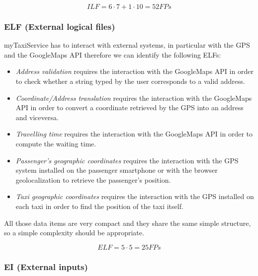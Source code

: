 \[
ILF=6\cdot7+1\cdot10=52FPs
\]



\subsubsection{ELF (External logical files)}

myTaxiService has to interact with external systems, in particular
with the GPS and the GoogleMaps API therefore we can identify the
following ELFs:
\begin{itemize}
\item \emph{Address validation }requires the interaction with the GoogleMaps
API in order to check whether a string typed by the user corresponds
to a valid address.
\item \emph{Coordinate/Address translation} requires the interaction with
the GoogleMaps API in order to convert a coordinate retrieved by the
GPS into an address and viceversa.
\item \emph{Travelling time }requires the interaction with the GoogleMaps
API in order to compute the waiting time.
\item \emph{Passenger's geographic coordinates} requires the interaction
with the GPS system installed on the passenger smartphone or with
the browser geolocalization to retrieve the passenger's position.
\item \emph{Taxi geographic coordinates} requires the interaction with the
GPS installed on each taxi in order to find the position of the taxi
itself.
\end{itemize}
All those data items are very compact and they share the same simple
structure, so a simple complexity should be appropriate. 

\[
ELF=5\cdot5=25FPs
\]



\subsubsection{EI (External inputs)}


